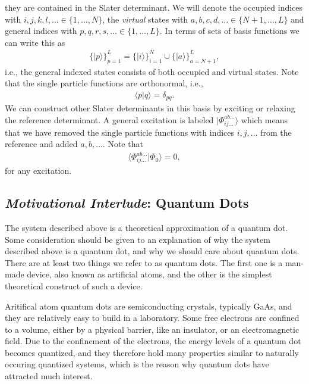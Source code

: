 \documentclass[
    a4paper, aps, twocolumn, floatfix, superscriptaddress,
    nofootinbib]{revtex4-1}
\newcommand{\1}{\mathds{1}}
\newcommand{\ket}[1]{\rvert #1\rangle}
\newcommand{\braket}[2]{\langle #1 \vert #2 \rangle}
\begin{document}
    they are contained in the Slater determinant.  We will denote the occupied
    indices with $i, j, k, l, \dots \in \{1, \dots, N\}$, the \emph{virtual}
    states with $a, b, c, d, \dots \in \{N + 1, \dots, L\}$ and general indices
    with $p, q, r, s, \dots \in \{1, \dots, L\}$. In terms of sets of basis
    functions we can write this as
    \begin{align}
        \{\ket{p}\}_{p = 1}^L
        = \{\ket{i}\}_{i = 1}^N
        \cup
        \{\ket{a}\}_{a = N + 1}^L,
    \end{align}
    i.e., the general indexed states consists of both occupied and virtual
    states. Note that the single particle functions are orthonormal, i.e.,
    \begin{align}
        \braket{p}{q} = \delta_{pq}.
    \end{align}
    We can construct other Slater determinants in this basis by exciting
    or relaxing the reference determinant. A general excitation is labeled
    $\ket{\Phi_{ij\dots}^{ab\dots}}$ which means that we have removed the single
    particle functions with indices $i, j, \dots$ from the reference and added
    $a, b, \dots$. Note that
    \begin{align}
        \braket{\Phi^{ab\dots}_{ij\dots}}{\Phi_0} = 0,
        \label{eq:excited_overlap}
    \end{align}
    for any excitation.

    \subsection{\emph{Motivational Interlude}: Quantum Dots}

        The system described above is a theoretical approximation of a quantum
        dot. Some consideration should be given to an explanation of why the
        system described above is a quantum dot, and why we should care about
        quantum dots.  There are at least two things we refer to as quantum
        dots. The first one is a man-made device, also known as artificial
        atoms, and the other is the simplest theoretical construct of such a
        device.

        Aritifical atom quantum dots are semiconducting crystals, typically
        GaAs, and they are relatively easy to build in a laboratory. Some free
        electrons are confined to a volume, either by a physical barrier, like
        an insulator, or an electromagnetic field\cite{reimann2002electronic}.
        Due to the confinement of the electrons, the energy levels of a quantum
        dot becomes quantized, and they therefore hold many properties similar
        to naturally occuring quantized systems, which is the reason why quantum
        dots have attracted much interest.
\end{document}
